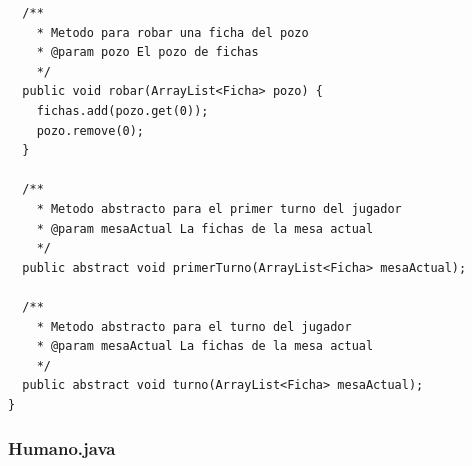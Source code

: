 \documentclass[12pt]{article}
\begin{document}
\begin{lstlisting}
  /**
    * Metodo para robar una ficha del pozo
    * @param pozo El pozo de fichas
    */
  public void robar(ArrayList<Ficha> pozo) {
    fichas.add(pozo.get(0));
    pozo.remove(0);
  }

  /**
    * Metodo abstracto para el primer turno del jugador
    * @param mesaActual La fichas de la mesa actual
    */
  public abstract void primerTurno(ArrayList<Ficha> mesaActual);

  /**
    * Metodo abstracto para el turno del jugador
    * @param mesaActual La fichas de la mesa actual
    */
  public abstract void turno(ArrayList<Ficha> mesaActual);
}
  \end{lstlisting}

  \subsubsection{Humano.java}
\end{document}
